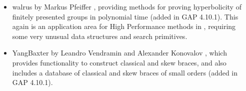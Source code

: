 \begin{itemize}
%
%

\item
{\sf walrus} by Markus Pfeiffer \cite{walrus}, providing methods for proving 
hyperbolicity of finitely presented groups in polynomial time
(added in GAP 4.10.1). This again is an application area for High
Performance methods in \GAP, requiring some very unusual data
structures and search primitives.

\item
{\sf YangBaxter} by Leandro Vendramin and Alexander Konovalov \cite{YangBaxter}, 
which provides functionality to construct classical and 
skew braces, and also includes a database of classical 
and skew braces of small orders (added in GAP 4.10.1).

\end{itemize}
